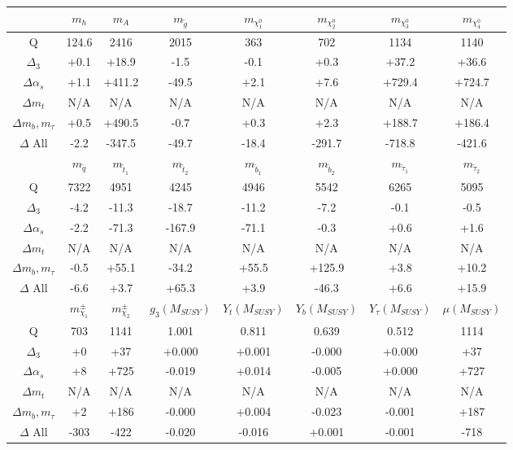 \begin{table}
\begin{center}
\begin{tabular}{|c|ccccccc|}\hline
 \vphantom{\bigg[} & $m_h$   & $m_A$   & $m_{\tilde g}$   & $m_{\chi_1^0}$   & $m_{\chi_2^0}$   & $m_{\chi_3^0}$   & $m_{\chi_4^0}$   \\ \hline
 Q                & 124.6 & 2416 & 2015 &  363 &  702 & 1134 &1140\\
$\Delta_3$  &   +0.1 & +18.9 &  -1.5 &  -0.1 &  +0.3 & +37.2 &+36.6\\
$\Delta \alpha_s$   &  +1.1 & +411.2 & -49.5 &  +2.1 &  +7.6 & +729.4 &+724.7\\
$\Delta m_t$       & N/A & N/A & N/A & N/A & N/A & N/A & N/A  \\
$\Delta m_b, m_\tau$ &  +0.5 & +490.5 &  -0.7 &  +0.3 &  +2.3 & +188.7 &+186.4\\
$\Delta$ All       &  -2.2 & -347.5 & -49.7 & -18.4 & -291.7 & -718.8 &-421.6\\

%
\hline  \vphantom{\bigg[}  & $m_{{\tilde q}}$  & $m_{{\tilde t}_1}$  & $m_{{\tilde t}_2}$  & $m_{{\tilde b}_1}$  & $m_{{\tilde b}_2}$  & $m_{{\tilde \tau}_1}$  & $m_{{\tilde \tau}_2}$ \\ \hline
Q              &7322 & 4951 & 4245 & 4946 & 5542 & 6265 &5095\\
$\Delta_3$  &   -4.2 & -11.3 & -18.7 & -11.2 &  -7.2 &  -0.1 & -0.5\\
$\Delta \alpha_s$  &   -2.2 & -71.3 & -167.9 & -71.1 &  -0.3 &  +0.6 & +1.6\\
$\Delta m_t$      &  N/A & N/A & N/A & N/A & N/A & N/A & N/A \\
$\Delta m_b, m_\tau$&   -0.5 & +55.1 & -34.2 & +55.5 & +125.9 &  +3.8 &+10.2\\
$\Delta$ All      &   -6.6 &  +3.7 & +65.3 &  +3.9 & -46.3 &  +6.6 &+15.9\\

%
\hline  \vphantom{\bigg[}  & $m_{\chi_1}^\pm$  & $m_{\chi_2}^\pm$  & $g_3(M_{SUSY})$  & $Y_t(M_{SUSY})$  & $Y_b(M_{SUSY})$  & $Y_\tau(M_{SUSY})$  & $\mu(M_{SUSY})$     \\ \hline
 Q                    &  703 & 1141 & 1.001 & 0.811 & 0.639 & 0.512 & 1114\\
$\Delta_3$  &    +0 &  +37 & +0.000 & +0.001 & -0.000 & +0.000 &  +37\\
$\Delta \alpha_s$  &    +8 & +725 & -0.019 & +0.014 & -0.005 & +0.000 & +727\\
$\Delta m_t$      &  N/A & N/A & N/A & N/A & N/A & N/A& N/A\\
$\Delta m_b, m_\tau$&    +2 & +186 & -0.000 & +0.004 & -0.023 & -0.001 & +187\\
$\Delta$ All      &  -303 & -422 & -0.020 & -0.016 & +0.001 & -0.001 & -718\\


\end{tabular}
\end{center}
\end{table}
